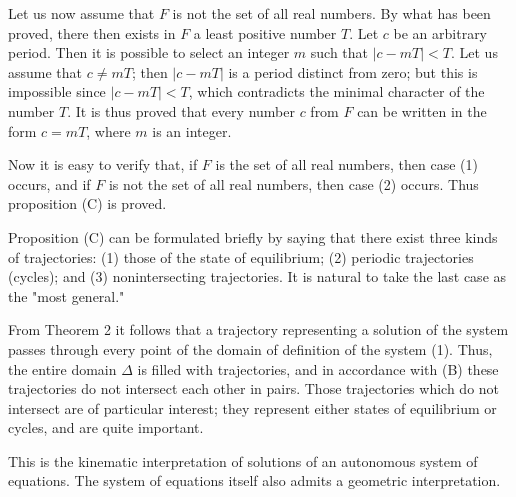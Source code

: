 \documentclass[10pt,a5paper]{book}
\theoremstyle{plain}
\theoremstyle{definition}
\theoremstyle{remark}
\begin{document}
Let us now assume that $F$ is not the set of all real numbers. By what has been proved, there then exists in $F$ a least positive number $T$. Let $c$ be an arbitrary period. Then it is possible to select an integer $m$ such that $|c-m T|<T$. Let us assume that $c \neq m T$; then $|c-m T|$ is a period distinct from zero; but this is impossible since $|c-m T|<T$, which contradicts the minimal character of the number $T$. It is thus proved that every number $c$ from $F$ can be written in the form $c=m T$, where $m$ is an integer.

Now it is easy to verify that, if $F$ is the set of all real numbers, then case (1) occurs, and if $F$ is not the set of all real numbers, then case (2) occurs. Thus proposition (C) is proved.

Proposition (C) can be formulated briefly by saying that there exist three kinds of trajectories: (1) those of the state of equilibrium; (2) periodic trajectories (cycles); and (3) nonintersecting trajectories. It is natural to take the last case as the "most general."

From Theorem 2 it follows that a trajectory representing a solution of the system passes through every point of the domain of definition of the system (1). Thus, the entire domain $\Delta$ is filled with trajectories, and in accordance with (B) these trajectories do not intersect each other in pairs. Those trajectories which do not intersect are of particular interest; they represent either states of equilibrium or cycles, and are quite important.

This is the kinematic interpretation of solutions of an autonomous system of equations. The system of equations itself also admits a geometric interpretation.
\end{document}
